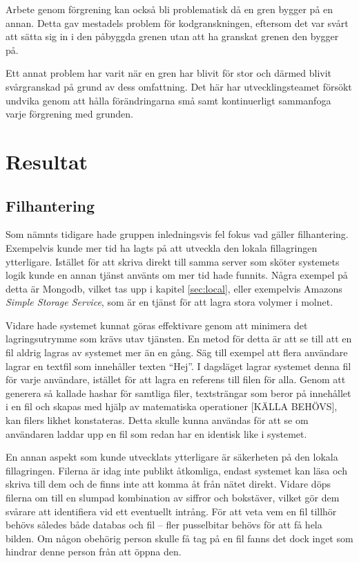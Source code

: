 Arbete genom förgrening kan också bli problematisk då en gren bygger på en annan. Detta gav mestadels problem för kodgranskningen, eftersom det var svårt att sätta sig in i den påbyggda grenen utan att ha granskat grenen den bygger på.

Ett annat problem har varit när en gren har blivit för stor och därmed blivit svårgranskad på grund av dess omfattning. Det här har utvecklingsteamet försökt undvika genom att hålla förändringarna små samt kontinuerligt sammanfoga varje förgrening med grunden.

\section{Resultat}

\subsection{Filhantering}

Som nämnts tidigare hade gruppen inledningsvis fel fokus vad gäller filhantering. Exempelvis kunde mer tid ha lagts på att utveckla den lokala fillagringen ytterligare. Istället för att skriva direkt till samma server som sköter systemets logik kunde en annan tjänst använts om mer tid hade funnits. Några exempel på detta är Mongodb, vilket tas upp i kapitel \ref{sec:local}, eller exempelvis Amazons \emph{Simple Storage Service}, som är en tjänst för att lagra stora volymer i molnet.

Vidare hade systemet kunnat göras effektivare genom att minimera det lagringsutrymme som krävs utav tjänsten. En metod för detta är att se till att en fil aldrig lagras av systemet mer än en gång. Säg till exempel att flera användare lagrar en textfil som innehåller texten ``Hej''. I dagsläget lagrar systemet denna fil för varje användare, istället för att lagra en referens till filen för alla. Genom att generera så kallade hashar för samtliga filer, textsträngar som beror på innehållet i en fil och skapas med hjälp av matematiska operationer [KÄLLA BEHÖVS], kan filers likhet konstateras. Detta skulle kunna användas för att se om användaren laddar upp en fil som redan har en identisk like i systemet.

En annan aspekt som kunde utvecklats ytterligare är säkerheten på den lokala fillagringen. Filerna är idag inte publikt åtkomliga, endast systemet kan läsa och skriva till dem och de finns inte att komma åt från nätet direkt. Vidare döps filerna om till en slumpad kombination av siffror och bokstäver, vilket gör dem svårare att identifiera vid ett eventuellt intrång. För att veta vem en fil tillhör behövs således både databas och fil – fler pusselbitar behövs för att få hela bilden. Om någon obehörig person skulle få tag på en fil fanns det dock inget som hindrar denne person från att öppna den.

